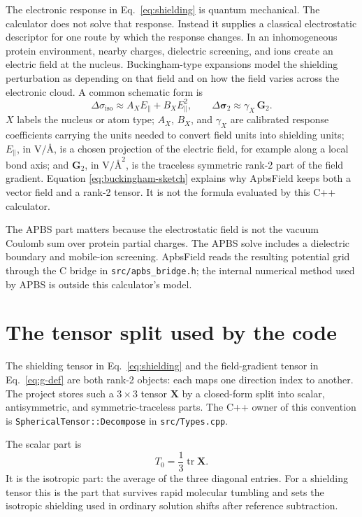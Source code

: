 \documentclass[11pt]{article}
\begin{document}
The electronic response in Eq.~\eqref{eq:shielding} is quantum mechanical. The
calculator does not solve that response. Instead it supplies a classical
electrostatic descriptor for one route by which the response changes. In an
inhomogeneous protein environment, nearby charges, dielectric screening, and
ions create an electric field at the nucleus. Buckingham-type expansions model
the shielding perturbation as depending on that field and on how the field
varies across the electronic cloud. A common schematic form is
\begin{equation}
  \Delta\sigma_{\mathrm{iso}}
    \approx A_X E_\parallel + B_X E_\parallel^2,
  \qquad
  \Delta\bm\sigma_{2}
    \approx \gamma_X\,\bm G_{2}.
  \label{eq:buckingham-sketch}
\end{equation}
\(X\) labels the nucleus or atom type; \(A_X\), \(B_X\), and \(\gamma_X\) are
calibrated response coefficients carrying the units needed to convert
field units into shielding units; \(E_\parallel\), in
\(\si{\volt\per\angstrom}\), is a chosen projection of the electric field, for
example along a local bond axis; and \(\bm G_2\), in
\(\si{\volt\per\angstrom\squared}\), is the traceless symmetric rank-2 part of
the field gradient. Equation
\eqref{eq:buckingham-sketch} explains why ApbsField keeps both a vector field
and a rank-2 tensor. It is not the formula evaluated by this C++ calculator.

The APBS part matters because the electrostatic field is not the vacuum Coulomb
sum over protein partial charges. The APBS solve includes a dielectric boundary
and mobile-ion screening. ApbsField reads the resulting potential grid through
the C bridge in \texttt{src/apbs\_bridge.h}; the internal numerical method used
by APBS is outside this calculator's model.

\section{The tensor split used by the code}

The shielding tensor in Eq.~\eqref{eq:shielding} and the field-gradient tensor
in Eq.~\eqref{eq:g-def} are both rank-2 objects: each maps one direction index
to another. The project stores such a \(3\times3\) tensor \(\bm X\) by a
closed-form split into scalar, antisymmetric, and symmetric-traceless parts. The
C++ owner of this convention is \texttt{SphericalTensor::Decompose} in
\texttt{src/Types.cpp}.

The scalar part is
\begin{equation}
  T_0 = \frac{1}{3}\operatorname{tr}\bm X .
  \label{eq:t0}
\end{equation}
It is the isotropic part: the average of the three diagonal entries. For a
shielding tensor this is the part that survives rapid molecular tumbling and
sets the isotropic shielding used in ordinary solution shifts after reference
subtraction.
\end{document}
